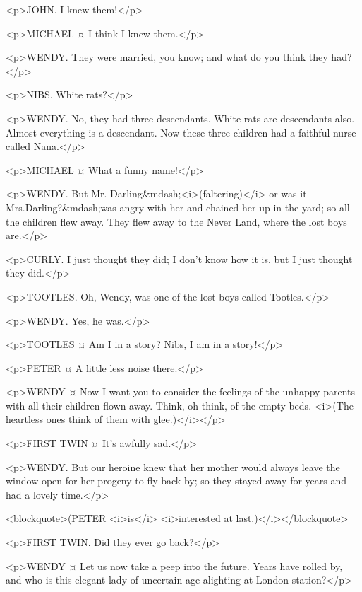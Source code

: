 <p>JOHN. I knew them!</p>

<p>MICHAEL ¤
I think I knew them.</p>

<p>WENDY. They were married, you know; and what do you think they had?</p>

<p>NIBS. White rats?</p>

<p>WENDY. No, they had three descendants. White rats are descendants also. Almost everything is a descendant. Now these three children had a faithful nurse called Nana.</p>

<p>MICHAEL ¤
What a funny name!</p>

<p>WENDY. But Mr. Darling&mdash;<i>(faltering)</i> or was it Mrs.Darling?&mdash;was angry with her and chained her up in the yard; so all the children flew away. They flew away to the Never Land, where the lost boys are.</p>

<p>CURLY. I just thought they did; I don't know how it is, but I just thought they did.</p>

<p>TOOTLES. Oh, Wendy, was one of the lost boys called Tootles.</p>

<p>WENDY. Yes, he was.</p>

<p>TOOTLES ¤
Am I in a story? Nibs, I am in a story!</p>

<p>PETER ¤
A little less noise there.</p>

<p>WENDY ¤
Now I want you to consider the feelings of the unhappy parents with all their children flown away. Think, oh think, of the empty beds. <i>(The heartless ones think of them with glee.)</i></p>

<p>FIRST TWIN ¤
It's awfully sad.</p>

<p>WENDY. But our heroine knew that her mother would always leave the window open for her progeny to fly back by; so they stayed away for years and had a lovely time.</p>

<blockquote>(PETER <i>is</i> <i>interested at last.)</i></blockquote>

<p>FIRST TWIN. Did they ever go back?</p>

<p>WENDY ¤
Let us now take a peep into the future. Years have rolled by, and who is this elegant lady of uncertain age alighting at London station?</p>

